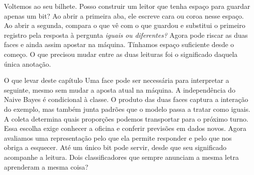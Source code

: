 Voltemos ao seu bilhete. Posso construir um leitor que tenha espaço para guardar apenas um bit? Ao abrir a primeira aba, ele escreve cara ou coroa nesse espaço. Ao abrir a segunda, compara o que vê com o que guardou e substitui o primeiro registro pela resposta à pergunta \emph{iguais ou diferentes?} Agora pode riscar as duas faces e ainda assim apostar na máquina. Tínhamos espaço suficiente desde o começo. O que precisou mudar entre as duas leituras foi o significado daquela única anotação.

\begin{quadro}{O que levar deste capítulo}
 Uma face pode ser necessária para interpretar a seguinte, mesmo sem mudar a aposta atual na máquina.
 A independência do Naive Bayes é condicional à classe. O produto das duas faces captura a interação do exemplo, mas também junta padrões que o modelo passa a tratar como iguais.
 A coleta determina quais proporções podemos transportar para o próximo turno. Essa escolha exige conhecer a oficina e conferir previsões em dados novos.
 Agora avaliamos uma representação pelo que ela permite responder e pelo que nos obriga a esquecer. Até um único bit pode servir, desde que seu significado acompanhe a leitura.
 Dois classificadores que sempre anunciam a mesma letra aprenderam a mesma coisa?
\end{quadro}
